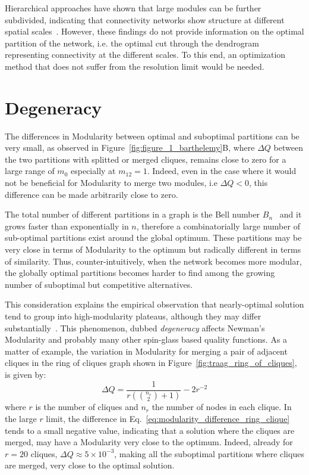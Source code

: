 Hierarchical approaches have shown that large modules can be further subdivided, indicating that connectivity networks show structure at different spatial scales~\cite{meunier2009}.
However, these findings do not provide information on the optimal partition of the network, i.e. the optimal cut through the dendrogram representing connectivity at the different scales.
To this end, an optimization method that does not suffer from the resolution limit would be needed.






\section{Degeneracy}\label{sec:degeneracy}
The differences in Modularity between optimal and suboptimal partitions can be very small, as observed in Figure~\ref{fig:figure_1_barthelemy}B, where $\Delta Q$ between the two partitions with splitted or merged cliques, remains close to zero for a large range of $m_0$ especially at $m_{12}=1$.
Indeed, even in the case where it would not be beneficial for Modularity to merge two modules, i.e $\Delta Q <0$, this difference can be made arbitrarily close to zero.

The total number of different partitions in a graph is the Bell number $B_n$~\cite{stanley1997} and it grows faster than exponentially in $n$, therefore a combinatorially large number of sub-optimal partitions exist around the global optimum. These partitions may be very close in terms of Modularity to the optimum but radically different in terms of similarity.
Thus, counter-intuitively, when the network becomes more modular, the globally optimal partitions becomes harder to find among the growing number of suboptimal but competitive alternatives.

This consideration explains the empirical observation that nearly-optimal solution tend to group into high-modularity plateaus, although they may differ substantially~\cite{good2009}. This phenomenon, dubbed \emph{degeneracy} affects Newman's Modularity and probably many other spin-glass based quality functions.
As a matter of example, the variation in Modularity for merging a pair of adjacent cliques in the ring of cliques graph shown in Figure~\ref{fig:traag_ring_of_cliques}, is given by:
\begin{equation}\label{eq:modularity_difference_ring_clique}
\Delta Q = \frac{1}{r\left(\binom{n_r}{2}+1\right)}-2r^{-2}
\end{equation}
where $r$ is the number of cliques and $n_r$ the number of nodes in each clique.
In the large $r$ limit, the difference in Eq.~\ref{eq:modularity_difference_ring_clique} tends to a small negative value, indicating that a solution where the cliques are merged, may have a Modularity very close to the optimum. Indeed, already for $r=20$ cliques, $\Delta Q \approx 5\times 10^{-3}$, making all the suboptimal partitions where cliques are merged, very close to the optimal solution.

